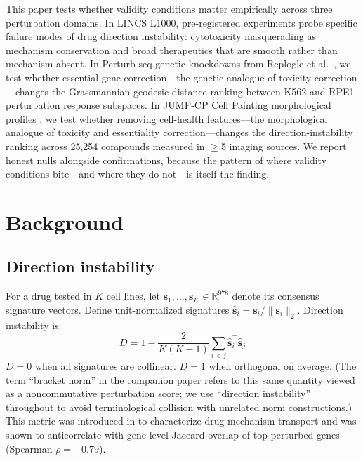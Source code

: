 \documentclass{article}
\begin{document}
This paper tests whether validity conditions matter empirically across three
perturbation domains. In LINCS L1000, pre-registered experiments probe
specific failure modes of drug direction instability: cytotoxicity
masquerading as mechanism conservation and broad therapeutics that are
smooth rather than mechanism-absent. In Perturb-seq genetic knockdowns from
Replogle et al.\ \citep{replogle2022mapping}, we test whether essential-gene
correction---the genetic analogue of toxicity correction---changes the
Grassmannian geodesic distance ranking between K562 and RPE1 perturbation
response subspaces. In JUMP-CP Cell Painting morphological profiles
\citep{chandrasekaran2023jump}, we test whether removing cell-health
features---the morphological analogue of toxicity and essentiality
correction---changes the direction-instability ranking across 25{,}254
compounds measured in $\geq$5 imaging sources. We report honest nulls
alongside confirmations, because the pattern of where validity conditions
bite---and where they do not---is itself the finding.

\section{Background}

\subsection{Direction instability}

For a drug tested in $K$ cell lines, let $\mathbf{s}_1, \ldots,
\mathbf{s}_K \in \mathbb{R}^{978}$ denote its consensus signature vectors.
Define unit-normalized signatures $\hat{\mathbf{s}}_i = \mathbf{s}_i /
\|\mathbf{s}_i\|_2$. Direction instability is:
\begin{equation}
  D = 1 - \frac{2}{K(K-1)} \sum_{i < j}
    \hat{\mathbf{s}}_i^\top \hat{\mathbf{s}}_j
  \label{eq:direction_instability}
\end{equation}
$D = 0$ when all signatures are collinear. $D = 1$ when orthogonal on average.
(The term ``bracket norm'' in the companion paper
\citep{tower2026bracket} refers to this same quantity viewed as a
noncommutative perturbation score; we use ``direction instability''
throughout to avoid terminological collision with unrelated norm
constructions.)
This metric was introduced in \citet{tower2026bracket} to characterize drug mechanism
transport and was shown to anticorrelate with gene-level Jaccard overlap of
top perturbed genes (Spearman $\rho = -0.79$).
\end{document}

